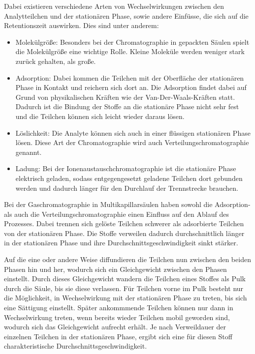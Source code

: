 Dabei existieren verschiedene Arten von Wechselwirkungen zwischen den Analytteilchen und der stationären Phase, sowie andere Einfüsse, die sich auf die Retentionszeit auswirken. Dies sind unter anderem:
\begin{itemize}
 \item Molekülgröße: Besonders bei der Chromatographie in gepackten Säulen spielt die Molekülgröße eine wichtige Rolle. Kleine Moleküle werden weniger stark zurück gehalten, als große.
 \item Adsorption: Dabei kommen die Teilchen mit der Oberfläche der stationären Phase in Kontakt und reichern sich dort an. Die Adsorption findet dabei auf Grund von physikalischen Kräften wie der Van-Der-Waals-Kräften statt. Dadurch ist die Bindung der Stoffe an die stationäre Phase nicht sehr fest und die Teilchen können sich leicht wieder daraus lösen.
 \item Löslichkeit: Die Analyte können sich auch in einer flüssigen stationären Phase lösen. Diese Art der Chromatographie wird auch Verteilungschromatographie genannt.
 \item Ladung: Bei der Ionenaustauschchromatographie ist die stationäre Phase elektrisch geladen, sodass entgegengesetzt geladene Teilchen dort gebunden werden und dadurch länger für den Durchlauf der Trennstrecke brauchen.
\end{itemize}


Bei der Gaschromatographie in Multikapillarsäulen haben sowohl die Adsorption- als auch die Verteilungschromatographie einen Einfluss auf den Ablauf des Prozesses. Dabei trennen sich gelöste Teilchen schwerer als adsorbierte Teilchen von der stationären Phase. Die Stoffe verweilen dadurch durchschnittlich länger in der stationären Phase und ihre Durchschnittsgeschwindigkeit sinkt stärker.

Auf die eine oder andere Weise diffundieren die Teilchen nun zwischen den beiden Phasen hin und her, wodurch sich ein Gleichgewicht zwischen den Phasen einstellt. Durch dieses Gleichgewicht wandern die Teilchen eines Stoffes als Pulk durch die Säule, bis sie diese verlassen. Für Teilchen vorne im Pulk besteht nur die Möglichkeit, in Wechselwirkung mit der stationären Phase zu treten, bis sich eine Sättigung einstellt. Später ankommmende Teilchen können nur dann in Wechselwirkung treten, wenn bereits wieder Teilchen mobil geworden sind, wodurch sich das Gleichgewicht aufrecht erhält. 
Je nach Verweildauer der einzelnen Teilchen in der stationären Phase, ergibt sich eine für diesen Stoff charakteristische Durchschnittsgeschwindigkeit.%


